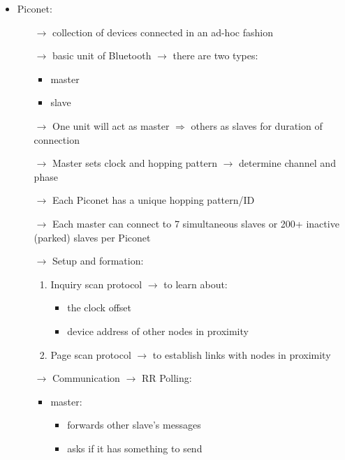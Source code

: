 \begin{itemize}
    \item Piconet:
    \begin{itemize}
        \item[$\rightarrow$] collection of devices connected in an ad-hoc fashion
        \item[$\rightarrow$] basic unit of Bluetooth $\rightarrow$ there are two types:
        \begin{itemize}
            \item master
            \item slave
        \end{itemize} 
        \item[$\rightarrow$] One unit will act as master $\Rightarrow$ others as slaves for duration of connection
        \item[$\rightarrow$] Master sets clock and hopping pattern $\rightarrow$ determine channel and phase
        \item[$\rightarrow$] Each Piconet has a unique hopping pattern/ID
        \item[$\rightarrow$] Each master can connect to 7 simultaneous slaves or 200+
        inactive\\(parked) slaves per Piconet
        \item[$\rightarrow$] Setup and formation:
        \begin{enumerate}
            \item Inquiry scan protocol $\rightarrow$ to learn about:
            \begin{itemize}
                \item the clock offset
                \item device address of other nodes in proximity 
            \end{itemize}
            \item Page scan protocol $\rightarrow$ to establish links with nodes in proximity
        \end{enumerate}
        \newpage
        \item[$\rightarrow$] Communication $\rightarrow$ RR Polling:
        \begin{itemize}
            \item master:
            \begin{itemize}
                \item forwards other slave's messages
                \item asks if it has something to send

\end{itemize}
\end{itemize}
\end{itemize}
\end{itemize}
